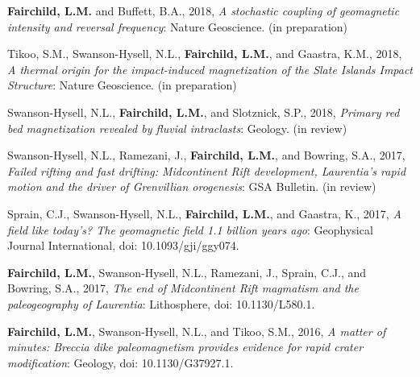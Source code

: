 \documentclass[11pt,a4paper,sans]{moderncv}        %
\begin{document}
\begin{etaremune}

\vspace{6pt}

\item{\textbf{Fairchild, L.M.} and Buffett, B.A., 2018, \textit{A stochastic coupling of geomagnetic intensity and reversal frequency}: Nature Geoscience. (in preparation)}

\vspace{3pt}

\item{Tikoo, S.M., Swanson-Hysell, N.L., \textbf{Fairchild, L.M.}, and Gaastra, K.M., 2018, \textit{A thermal origin for the impact-induced magnetization of the Slate Islands Impact Structure}: Nature Geoscience. (in preparation)}

\vspace{3pt}

\item{Swanson-Hysell, N.L., \textbf{Fairchild, L.M.}, and Slotznick, S.P., 2018, \textit{Primary red bed magnetization revealed by fluvial intraclasts}: Geology. (in review)}

\vspace{3pt}

\item{Swanson-Hysell, N.L., Ramezani, J., \textbf{Fairchild, L.M.}, and Bowring, S.A., 2017, \textit{Failed rifting and fast drifting: Midcontinent Rift development, Laurentia's rapid motion and the driver of Grenvillian orogenesis}: GSA Bulletin. (in review)}

\vspace{3pt}

\item{Sprain, C.J., Swanson-Hysell, N.L., \textbf{Fairchild, L.M.}, and Gaastra, K., 2017, \textit{A field like today's? The geomagnetic field 1.1 billion years ago}: Geophysical Journal International, doi: 10.1093/gji/ggy074.}

\vspace{3pt}

\item{\textbf{Fairchild, L.M.}, Swanson-Hysell, N.L., Ramezani, J., Sprain, C.J., and Bowring, S.A., 2017, \textit{The end of Midcontinent Rift magmatism and the paleogeography of Laurentia}: Lithosphere, doi: 10.1130/L580.1.}

\vspace{3pt}

\item{\textbf{Fairchild, L.M.}, Swanson-Hysell, N.L., and Tikoo, S.M., 2016, \textit{A matter of minutes: Breccia dike paleomagnetism provides evidence for rapid crater modification}: Geology, doi: 10.1130/G37927.1.}


\end{etaremune}
\end{document}
